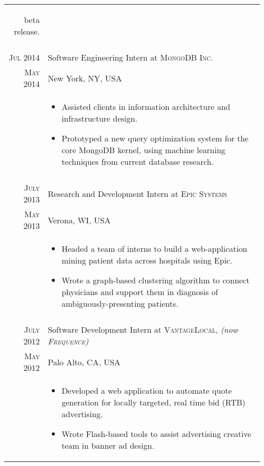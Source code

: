 \documentclass[a4paper,10pt]{article}
\begin{document}
\begin{longtable}{r|p{11cm}}
{\begin{itemize}
{			beta release.
		}
	\end{itemize}
   }\\
 \multicolumn{2}{c}{} \\
 \nopagebreak \textsc{Jul 2014} & Software Engineering Intern at \textsc{MongoDB Inc.}\\
 \nopagebreak \textsc{May 2014} & \small{New York, NY, USA} \\
 \nopagebreak	& \footnotesize{
	\begin{itemize}
		\item[]{
			Assisted clients in information architecture and infrastructure design.
		}
		\item[]{
			Prototyped a new query optimization system for the core MongoDB kernel,
			using machine learning techniques from current database research.
		}
	\end{itemize}
   }\\
 \multicolumn{2}{c}{} \\
 \nopagebreak \textsc{July 2013} & Research and Development Intern at \textsc{Epic Systems}\\
 \nopagebreak \textsc{May 2013} & \small{Verona, WI, USA} \\
 \nopagebreak	& \footnotesize{
	\begin{itemize}
		\item[]{
			Headed a team of interns to build a web-application mining patient
			 data across hospitals using Epic.
		}
		\item[]{
			Wrote a graph-based clustering algorithm to  connect physicians and
			support them in diagnosis of ambiguously-presenting patients.
		}
	\end{itemize}
   }\\
 \multicolumn{2}{c}{} \\
 \nopagebreak \textsc{July 2012} & Software Development Intern at \textsc{VantageLocal}, \small\emph{(now \textsc{Frequence})}\\
 \nopagebreak \textsc{May 2012} & \small{Palo Alto, CA, USA}\\
 \nopagebreak & \footnotesize{
	\begin{itemize}
		\item[]{
			Developed a web application to automate quote generation for
			locally targeted, real time bid (RTB) advertising.
		}
		\item[]{
			Wrote Flash-based tools to assist advertising creative team
			in banner ad design.
		}
	\end{itemize}
   }\\

\end{longtable}
\end{document}
